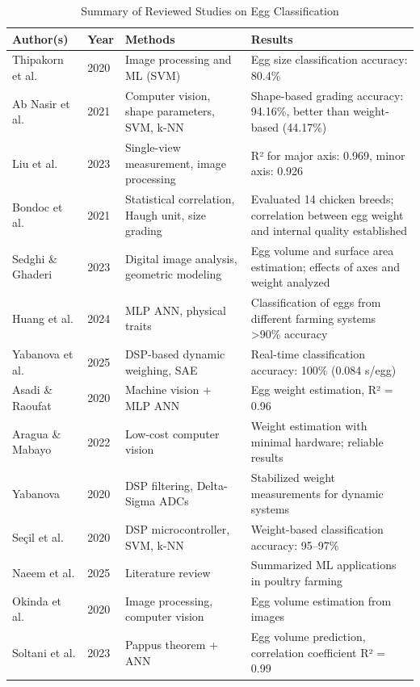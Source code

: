 \documentclass[conference]{IEEEtran}
\begin{document}
\begin{table}[ht]
	\centering
	\caption{Summary of Reviewed Studies on Egg Classification}
	\begin{tabular}{|p{3cm}|p{1.5cm}|p{6cm}|p{4cm}|}
		\hline
		\textbf{Author(s)} & \textbf{Year} & \textbf{Methods} & \textbf{Results} \\
		\hline
		Thipakorn et al. & 2020 & Image processing and ML (SVM) & Egg size classification accuracy: 80.4\% \\
		\hline
		Ab Nasir et al. & 2021 & Computer vision, shape parameters, SVM, k-NN & Shape-based grading accuracy: 94.16\%, better than weight-based (44.17\%) \\
		\hline
		Liu et al. & 2023 & Single-view measurement, image processing & R² for major axis: 0.969, minor axis: 0.926 \\
		\hline
		Bondoc et al. & 2021 & Statistical correlation, Haugh unit, size grading & Evaluated 14 chicken breeds; correlation between egg weight and internal quality established \\
		\hline
		Sedghi \& Ghaderi & 2023 & Digital image analysis, geometric modeling & Egg volume and surface area estimation; effects of axes and weight analyzed \\
		\hline
		Huang et al. & 2024 & MLP ANN, physical traits & Classification of eggs from different farming systems >90\% accuracy \\
		\hline
		Yabanova et al. & 2025 & DSP-based dynamic weighing, SAE & Real-time classification accuracy: 100\% (0.084 s/egg) \\
		\hline
		Asadi \& Raoufat & 2020 & Machine vision + MLP ANN & Egg weight estimation, R² = 0.96 \\
		\hline
		Aragua \& Mabayo & 2022 & Low-cost computer vision & Weight estimation with minimal hardware; reliable results \\
		\hline
		Yabanova & 2020 & DSP filtering, Delta-Sigma ADCs & Stabilized weight measurements for dynamic systems \\
		\hline
		Seçil et al. & 2020 & DSP microcontroller, SVM, k-NN & Weight-based classification accuracy: 95–97\% \\
		\hline
		Naeem et al. & 2025 & Literature review & Summarized ML applications in poultry farming \\
		\hline
		Okinda et al. & 2020 & Image processing, computer vision & Egg volume estimation from images \\
		\hline
		Soltani et al. & 2023 & Pappus theorem + ANN & Egg volume prediction, correlation coefficient R² = 0.99 \\
		\hline
	\end{tabular}
	\label{tab:study_summary}
\end{table}
	
\end{document}

